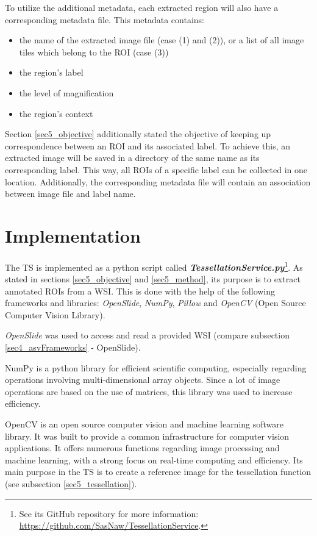 To utilize the additional metadata, each extracted region will also have a corresponding metadata file. This metadata contains:
\begin{itemize}
	\item the name of the extracted image file (case (1) and (2)), or a list of all image tiles which belong to the ROI (case (3))
	\item the region's label
	\item the level of magnification
	\item the region's context
\end{itemize}

Section \ref{sec5_objective} additionally stated the objective of keeping up correspondence between an ROI and its associated label. To achieve this, an extracted image will be saved in a directory of the same name as its corresponding label. This way, all ROIs of a specific label can be collected in one location. Additionally, the corresponding metadata file will contain an association between image file and label name.


\section{Implementation}
\label{sec5_impl}
The TS is implemented as a python script called \textbf{\emph{TessellationService.py}}\footnote{
	See its GitHub repository for more information: \url{https://github.com/SasNaw/TessellationService}.
}. As stated in sections \ref{sec5_objective} and \ref{sec5_method}, its purpose is to extract annotated ROIs from a WSI. This is done with the help of the following frameworks and libraries: \emph{OpenSlide}, \emph{NumPy}, \emph{Pillow} and \emph{OpenCV} (Open Source Computer Vision Library).

\emph{OpenSlide} was used to access and read a provided WSI (compare subsection \ref{sec4_asvFrameworks} - OpenSlide).

NumPy is a python library for efficient scientific computing, especially regarding operations involving multi-dimensional array objects\cite{Walt11}. Since a lot of image operations are based on the use of matrices, this library was used to increase efficiency.

OpenCV is an open source computer vision and machine learning software library. It was built to provide a common infrastructure for computer vision applications. It offers numerous functions regarding image processing and machine learning, with a strong focus on real-time computing and efficiency\cite{Bradski08}. Its main purpose in the TS is to create a reference image for the tessellation function (see subsection \ref{sec5_tessellation}).

